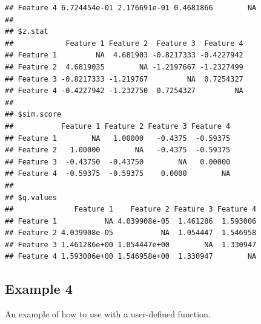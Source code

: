 \documentclass{article}\usepackage[]{graphicx}\usepackage[usenames,dvipsnames]{color}
\newenvironment{knitrout}{}{} %
\begin{document}
\begin{knitrout}
\begin{kframe}
\begin{verbatim}
## Feature 4 6.724454e-01 2.176691e-01 0.4681866        NA
## 
## $z.stat
##            Feature 1 Feature 2  Feature 3  Feature 4
## Feature 1         NA  4.681903 -0.8217333 -0.4227942
## Feature 2  4.6819035        NA -1.2197667 -1.2327499
## Feature 3 -0.8217333 -1.219767         NA  0.7254327
## Feature 4 -0.4227942 -1.232750  0.7254327         NA
## 
## $sim.score
##           Feature 1 Feature 2 Feature 3 Feature 4
## Feature 1        NA   1.00000   -0.4375  -0.59375
## Feature 2   1.00000        NA   -0.4375  -0.59375
## Feature 3  -0.43750  -0.43750        NA   0.00000
## Feature 4  -0.59375  -0.59375    0.0000        NA
## 
## $q.values
##              Feature 1    Feature 2 Feature 3 Feature 4
## Feature 1           NA 4.039908e-05  1.461286  1.593006
## Feature 2 4.039908e-05           NA  1.054447  1.546958
## Feature 3 1.461286e+00 1.054447e+00        NA  1.330947
## Feature 4 1.593006e+00 1.546958e+00  1.330947        NA
\end{verbatim}
\end{kframe}
\end{knitrout}

\subsection{Example 4}

An example of how to use  with a user-defined  function.
\end{document}
